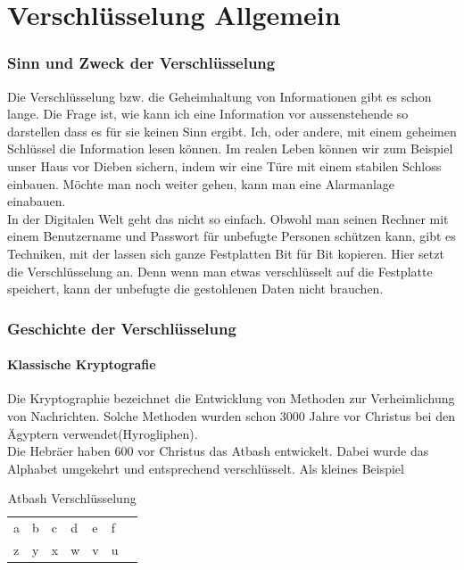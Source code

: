 \part{Verschlüsselung Allgemein}
\section{Sinn und Zweck der Verschlüsselung}
Die Verschlüsselung bzw. die Geheimhaltung von Informationen gibt es schon lange. Die Frage ist, wie kann ich eine Information vor aussenstehende so darstellen dass es für sie keinen Sinn ergibt. Ich, oder andere, mit einem geheimen Schlüssel die Information lesen können. Im realen Leben können wir zum Beispiel unser Haus vor Dieben sichern, indem wir eine Türe mit einem stabilen Schloss einbauen. Möchte man noch weiter gehen, kann man eine Alarmanlage einabauen.\\[2ex]
%
In der Digitalen Welt geht das nicht so einfach. Obwohl man seinen Rechner mit einem Benutzername und Passwort für unbefugte Personen schützen kann, gibt es Techniken, mit der lassen sich ganze Festplatten Bit für Bit kopieren. Hier setzt die Verschlüsselung an. Denn wenn man etwas verschlüsselt auf die Festplatte speichert, kann der unbefugte die gestohlenen Daten nicht brauchen.
\section{Geschichte der Verschlüsselung}
\subsection{Klassische Kryptografie}
Die Kryptographie bezeichnet die Entwicklung von Methoden zur Verheimlichung von Nachrichten.
Solche Methoden wurden schon 3000 Jahre vor Christus bei den Ägyptern verwendet(Hyrogliphen). \\
Die Hebräer haben 600 vor Christus das Atbash entwickelt. Dabei wurde das Alphabet umgekehrt und entsprechend verschlüsselt.
Als kleines Beispiel

\begin{table}[ht]
\caption{Atbash Verschlüsselung}
\begin{center}
\begin{tabular}{|l|l|l|l|l|l|l|}
  a & b & c & d & e & f\\
  z & y & x & w & v & u\\
\end{tabular}
\end{center}
\end{table}


